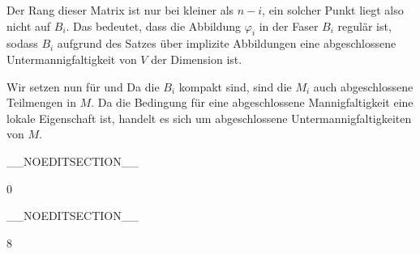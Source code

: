 {Der Rang dieser Matrix ist nur bei
 kleiner als $n-i$, ein solcher Punkt liegt also nicht auf $B_i$. Das bedeutet, dass die Abbildung $\varphi_i$ in der Faser $B_i$ regulär ist, sodass $B_i$ aufgrund des Satzes über implizite Abbildungen eine abgeschlossene Untermannigfaltigkeit von $V$ der Dimension
 ist.

Wir setzen nun
 für
 und
 Da die $B_i$ kompakt sind, sind die $M_i$ auch abgeschlossene Teilmengen in $M$. Da die Bedingung für eine abgeschlossene Mannigfaltigkeit eine lokale Eigenschaft ist, handelt es sich um abgeschlossene Untermannigfaltigkeiten von $M$.

 }

__NOEDITSECTION__

{0}

{

}
{  }

__NOEDITSECTION__

{8}

